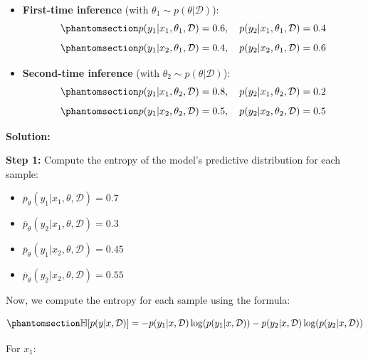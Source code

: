 \documentclass[
  letterpaper,
  numbers=noenddot,
  DIV=11]{scrreprt}
\providecommand{\tightlist}{%
  \setlength{\itemsep}{0pt}\setlength{\parskip}{0pt}}\usepackage{longtable,booktabs,array}
\theoremstyle{plain}
\theoremstyle{definition}
\theoremstyle{plain}
\theoremstyle{remark}
\begin{document}
\begin{itemize}
\item
  \textbf{First-time inference} (with
  \(\theta_1 \sim p(\theta | \mathcal{D})\)):
  \begin{equation}\phantomsection\label{eq-eq3.5}{
  p(y_1|x_1, \theta_1, \mathcal{D}) = 0.6, \quad p(y_2|x_1, \theta_1, \mathcal{D}) = 0.4
  }\end{equation} \begin{equation}\phantomsection\label{eq-eq3.6}{
  p(y_1|x_2, \theta_1, \mathcal{D}) = 0.4, \quad p(y_2|x_2, \theta_1, \mathcal{D}) = 0.6
  }\end{equation}
\item
  \textbf{Second-time inference} (with
  \(\theta_2 \sim p(\theta | \mathcal{D})\)):
  \begin{equation}\phantomsection\label{eq-eq3.7}{
  p(y_1|x_1, \theta_2, \mathcal{D}) = 0.8, \quad p(y_2|x_1, \theta_2, \mathcal{D}) = 0.2
  }\end{equation} \begin{equation}\phantomsection\label{eq-eq3.8}{
  p(y_1|x_2, \theta_2, \mathcal{D}) = 0.5, \quad p(y_2|x_2, \theta_2, \mathcal{D}) = 0.5
  }\end{equation}
\end{itemize}

\textbf{Solution:}

\textbf{Step 1:} Compute the entropy of the model's predictive
distribution for each sample:

\begin{itemize}
\tightlist
\item
  \(\overline{p}_{\theta}(y_1|x_1, \theta, \mathcal{D}) = 0.7\)
\item
  \(\overline{p}_{\theta}(y_2|x_1, \theta, \mathcal{D}) = 0.3\)
\item
  \(\overline{p}_{\theta}(y_1|x_2, \theta, \mathcal{D}) = 0.45\)
\item
  \(\overline{p}_{\theta}(y_2|x_2, \theta, \mathcal{D}) = 0.55\)
\end{itemize}

Now, we compute the entropy for each sample using the formula:

\begin{equation}\phantomsection\label{eq-eq3.9}{
\mathbb{H}[p(y|x, \mathcal{D})] = - p(y_1|x, \mathcal{D}) \log(p(y_1|x, \mathcal{D})) - p(y_2|x, \mathcal{D}) \log(p(y_2|x, \mathcal{D}))
}\end{equation}

For \(x_1\):
\end{document}
